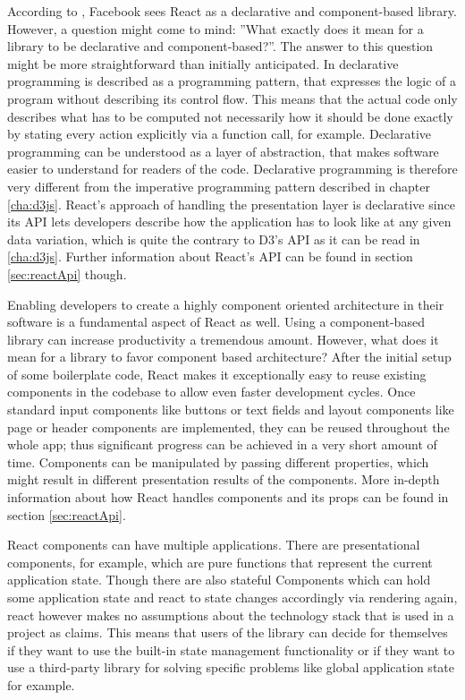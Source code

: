 According to \cite{React}, Facebook sees React as a declarative and component-based library. However, a question might come to mind: ''What exactly does it mean for a library to be declarative and component-based?''. The answer to this question might be more straightforward than initially anticipated. In \cite{lloyd1994practical} declarative programming is described as a programming pattern, that expresses the logic of a program without describing its control flow. This means that the actual code only describes what has to be computed not necessarily how it should be done exactly by stating every action explicitly via a function call, for example. Declarative programming can be understood as a layer of abstraction, that makes software easier to understand for readers of the code. Declarative programming is therefore very different from the imperative programming pattern described in chapter \ref{cha:d3js}. React's approach of handling the presentation layer is declarative since its API lets developers describe how the application has to look like at any given data variation, which is quite the contrary to D3's API as it can be read in \ref{cha:d3js}. Further information about React's API can be found in section \ref{sec:reactApi} though.

Enabling developers to create a highly component oriented architecture in their software is a fundamental aspect of React as well. Using a component-based library can increase productivity a tremendous amount. However, what does it mean for a library to favor component based architecture? After the initial setup of some boilerplate code, React makes it exceptionally easy to reuse existing components in the codebase to allow even faster development cycles. Once standard input components like buttons or text fields and layout components like page or header components are implemented, they can be reused throughout the whole app; thus significant progress can be achieved in a very short amount of time. Components can be manipulated by passing different properties, which might result in different presentation results of the components. More in-depth information about how React handles components and its props can be found in section \ref{sec:reactApi}.

React components can have multiple applications. There are presentational components, for example, which are pure functions that represent the current application state. Though there are also stateful Components which can hold some application state and react to state changes accordingly via rendering again, react however makes no assumptions about the technology stack that is used in a project as \cite{React} claims. This means that users of the library can decide for themselves if they want to use the built-in state management functionality or if they want to use a third-party library for solving specific problems like global application state for example.

